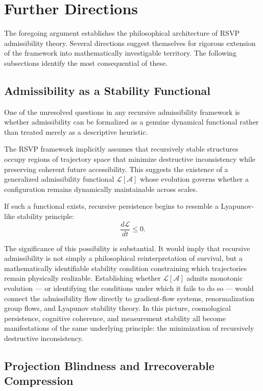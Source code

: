 \documentclass[12pt, a4paper]{article}
\newcommand{\Afield}{\mathcal{A}}
\begin{document}
\newpage
\section{Further Directions}

The foregoing argument establishes the philosophical architecture of RSVP
admissibility theory. Several directions suggest themselves for rigorous
extension of the framework into mathematically investigable territory. The
following subsections identify the most consequential of these.

\subsection{Admissibility as a Stability Functional}

One of the unresolved questions in any recursive admissibility framework is
whether admissibility can be formalized as a genuine dynamical functional
rather than treated merely as a descriptive heuristic.

The RSVP framework implicitly assumes that recursively stable structures
occupy regions of trajectory space that minimize destructive inconsistency
while preserving coherent future accessibility. This suggests the existence
of a generalized admissibility functional \(\mathcal{L}[\Afield]\) whose
evolution governs whether a configuration remains dynamically maintainable
across scales.

If such a functional exists, recursive persistence begins to resemble a
Lyapunov-like stability principle:
\[
\frac{d\mathcal{L}}{dt} \leq 0.
\]

The significance of this possibility is substantial. It would imply that
recursive admissibility is not simply a philosophical reinterpretation of
survival, but a mathematically identifiable stability condition constraining
which trajectories remain physically realizable. Establishing whether
\(\mathcal{L}[\Afield]\) admits monotonic evolution — or identifying the
conditions under which it fails to do so — would connect the admissibility
flow directly to gradient-flow systems, renormalization group flows, and
Lyapunov stability theory. In this picture, cosmological persistence,
cognitive coherence, and measurement stability all become manifestations of
the same underlying principle: the minimization of recursively destructive
inconsistency.

\subsection{Projection Blindness and Irrecoverable Compression}
\end{document}
